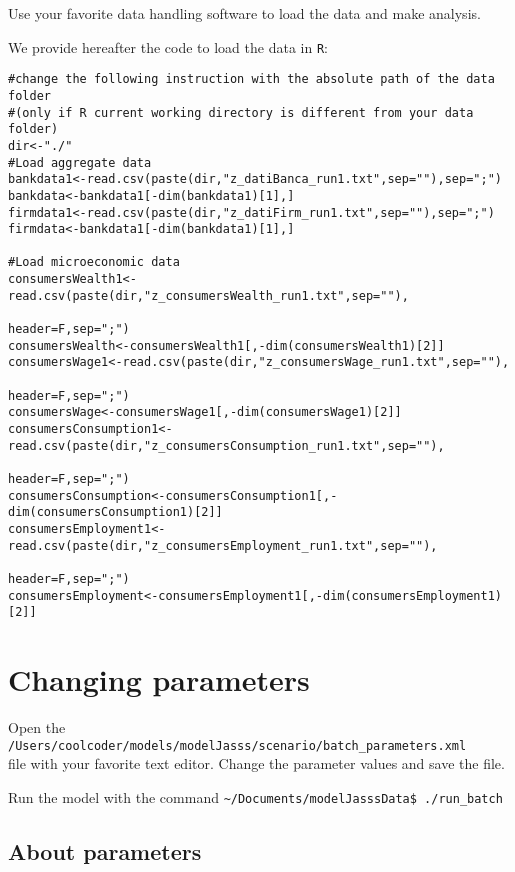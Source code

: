 \documentclass{article}
\begin{document}
Use your favorite data handling software to load the data and make analysis.


We provide hereafter the code to load the data in \verb+R+: 

\begin{verbatim}
#change the following instruction with the absolute path of the data folder 
#(only if R current working directory is different from your data folder)
dir<-"./"
#Load aggregate data
bankdata1<-read.csv(paste(dir,"z_datiBanca_run1.txt",sep=""),sep=";")
bankdata<-bankdata1[-dim(bankdata1)[1],]
firmdata1<-read.csv(paste(dir,"z_datiFirm_run1.txt",sep=""),sep=";")
firmdata<-bankdata1[-dim(bankdata1)[1],]

#Load microeconomic data
consumersWealth1<-read.csv(paste(dir,"z_consumersWealth_run1.txt",sep=""),
                                                        header=F,sep=";")
consumersWealth<-consumersWealth1[,-dim(consumersWealth1)[2]]
consumersWage1<-read.csv(paste(dir,"z_consumersWage_run1.txt",sep=""),
                                                        header=F,sep=";")
consumersWage<-consumersWage1[,-dim(consumersWage1)[2]]
consumersConsumption1<-read.csv(paste(dir,"z_consumersConsumption_run1.txt",sep=""),
                                                        header=F,sep=";")
consumersConsumption<-consumersConsumption1[,-dim(consumersConsumption1)[2]]
consumersEmployment1<-read.csv(paste(dir,"z_consumersEmployment_run1.txt",sep=""),
                                                                header=F,sep=";")
consumersEmployment<-consumersEmployment1[,-dim(consumersEmployment1)[2]]
\end{verbatim}


\section{Changing parameters}

Open the\\
\verb+/Users/coolcoder/models/modelJasss/scenario/batch_parameters.xml+ \\
file with your favorite text editor. Change the parameter values and save the file.

Run the model with the command
\vskip2mm
\noindent\verb+~/Documents/modelJasssData$ +\color{red}\verb|./run_batch| \color{black}
\vskip2mm

\subsection*{About parameters}
\end{document}
